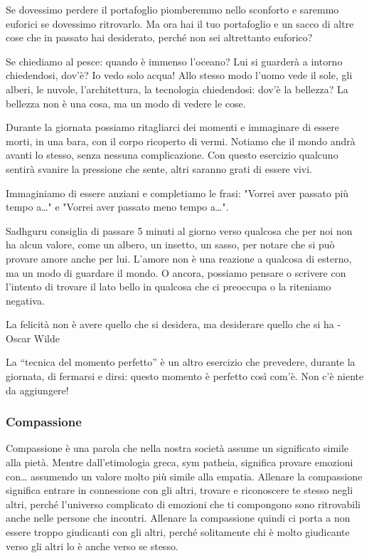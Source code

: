 \documentclass[12pt]{book} %
\begin{document}
Se dovessimo perdere il portafoglio piomberemmo nello sconforto e saremmo euforici se dovessimo ritrovarlo. Ma ora hai
il tuo portafoglio e un sacco di altre cose che in passato hai desiderato, perché non sei altrettanto euforico?

Se chiediamo al pesce: quando è immenso l'oceano? Lui si guarderà a intorno chiedendosi, dov'è? Io
vedo solo acqua! Allo stesso modo l'uomo vede il sole, gli alberi, le nuvole,
l'architettura, la tecnologia chiedendosi: dov'è la bellezza? La bellezza non è una cosa, ma un
modo di vedere le cose.

Durante la giornata possiamo ritagliarci dei momenti e immaginare di essere morti, in una bara, con il corpo ricoperto
di vermi. Notiamo che il mondo andrà avanti lo stesso, senza nessuna complicazione. Con questo esercizio qualcuno
sentirà svanire la pressione che sente, altri saranno grati di essere vivi.

Immaginiamo di essere anziani e completiamo le frasi: "Vorrei aver passato più tempo
a…" e "Vorrei aver passato meno tempo a…". 

Sadhguru consiglia di passare 5 minuti al giorno verso qualcosa che per noi non ha alcun valore, come un albero, un
insetto, un sasso, per notare che si può provare amore anche per lui. L'amore non è una reazione a qualcosa di esterno,
ma un modo di guardare il mondo. O ancora, possiamo pensare o scrivere con l'intento di trovare il
lato bello in qualcosa che ci preoccupa o la riteniamo negativa.

La felicità non è avere quello che si desidera, ma desiderare quello che si ha - Oscar Wilde 

La “tecnica del momento perfetto” è un altro esercizio che prevedere, durante la giornata, di fermarsi e dirsi: questo
momento è perfetto così com'è. Non c'è niente da aggiungere!

\subsubsection{Compassione}
Compassione è una parola che nella nostra società assume un significato simile alla pietà. Mentre
dall'etimologia greca, sym patheia, significa provare emozioni con… assumendo un valore molto più
simile alla empatia. Allenare la compassione significa entrare in connessione con gli altri, trovare e riconoscere te
stesso negli altri, perché l'universo complicato di emozioni che ti compongono sono ritrovabili
anche nelle persone che incontri. Allenare la compassione quindi ci porta a non essere troppo giudicanti con gli altri,
perché solitamente chi è molto giudicante verso gli altri lo è anche verso se stesso.
\end{document}

